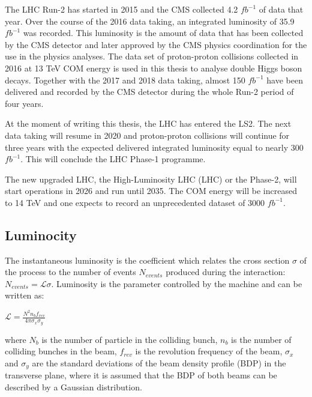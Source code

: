 The LHC Run-2 has started in 2015 and the CMS collected 4.2 $fb^{-1}$ of data that year. Over the course of the 2016 data taking, an integrated luminosity of 35.9 $fb^{-1}$ was recorded. This luminosity is the amount of data that has been collected by the CMS detector and later approved by the CMS physics coordination for the use in the physics analyses. The data set of proton-proton collisions collected in 2016 at 13 TeV COM energy is used in this thesis to analyse double Higgs boson decays. Together with the 2017 and 2018 data taking, almost 150 $fb^{-1}$ have been delivered and recorded by the CMS detector during the whole Run-2 period of four years. 

At the moment of writing this thesis, the LHC has entered the LS2. The next data taking will resume in 2020 and proton-proton collisions will continue for three years with the expected delivered integrated luminosity equal to nearly 300 $fb^{-1}$. This will conclude the LHC Phase-1 programme. 

The new upgraded LHC, the High-Luminosity LHC (LHC) or the Phase-2, will start operations in 2026 and run until 2035. The COM energy will be increased to 14 TeV and one expects to record an unprecedented dataset of 3000 $fb^{-1}$. 

\subsection{Luminocity}




The instantaneous luminosity is the coefficient which relates the cross section $\sigma$ of the process to the number of events $N_{events}$ produced during the interaction: $N_{events} = \mathcal{L}  \sigma$. Luminosity is the parameter controlled by the machine and can be written as:

$ \mathcal{L} =\frac{N^2 n_b f_{rev}}{4\pi \sigma_x \sigma_y}$

\noindent where $N_b$ is the number of particle in the colliding bunch, $n_b$ is the number of colliding bunches in the beam, $f_{rev}$ is the revolution frequency of the beam, $\sigma_x$ and $\sigma_y$ are the standard deviations of the beam density profile (BDP) in the transverse plane, where it is assumed that the BDP of both beams can be described by a Gaussian distribution.


